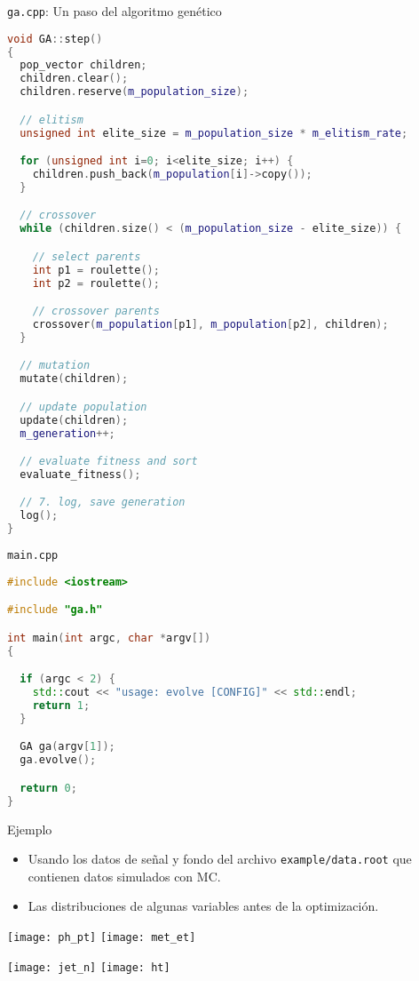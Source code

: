 \documentclass[center,10pt,cm]{beamer}
\begin{document}
\begin{frame}[fragile]{\texttt{ga.cpp}: Un paso del algoritmo gen\'etico}

  \begin{lstlisting}[language=c++]
void GA::step()
{
  pop_vector children;
  children.clear();
  children.reserve(m_population_size);

  // elitism
  unsigned int elite_size = m_population_size * m_elitism_rate;

  for (unsigned int i=0; i<elite_size; i++) {
    children.push_back(m_population[i]->copy());
  }

  // crossover
  while (children.size() < (m_population_size - elite_size)) {

    // select parents
    int p1 = roulette();
    int p2 = roulette();

    // crossover parents
    crossover(m_population[p1], m_population[p2], children);
  }

  // mutation
  mutate(children);

  // update population
  update(children);
  m_generation++;

  // evaluate fitness and sort
  evaluate_fitness();

  // 7. log, save generation
  log();
}
\end{lstlisting}
\end{frame}

\begin{frame}[fragile]{\texttt{main.cpp}}

  \begin{lstlisting}[language=c++]
#include <iostream>

#include "ga.h"

int main(int argc, char *argv[])
{

  if (argc < 2) {
    std::cout << "usage: evolve [CONFIG]" << std::endl;
    return 1;
  }

  GA ga(argv[1]);
  ga.evolve();

  return 0;
}
  \end{lstlisting}
\end{frame}

\begin{frame}[fragile]{Ejemplo}

  \begin{itemize}\itemsep0.2cm\parskip0.2cm
  \item Usando los datos de se\~nal y fondo del archivo \texttt{example/data.root} que contienen datos simulados con MC.
  \item Las distribuciones de algunas variables antes de la optimizaci\'on.
  \end{itemize}

  \texttt{[image: ph\_pt]}
  \texttt{[image: met\_et]}

  \texttt{[image: jet\_n]}
  \texttt{[image: ht]}

\end{frame}
\end{document}
